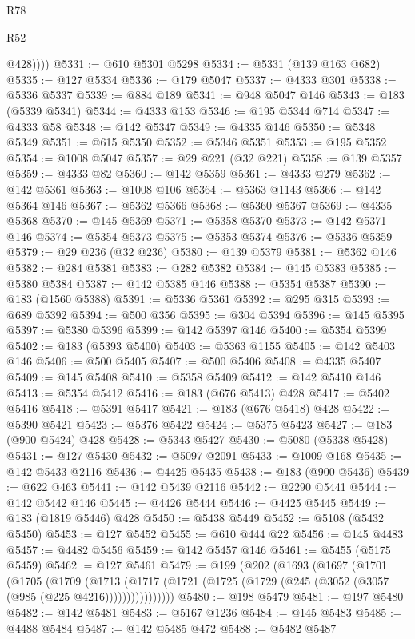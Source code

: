 \begin{lexlean}{R78}
\begin{lexlean}{R52}
\begin{coremodule}
{{{{{{{{{{{{{{{{{{{{{{{{{{{{{{{{{{{{{{{{{{{{{{{{{{{{{{{{{{{{{{{{{{{{{{{{{{{{{{{{{{{{{{{{{{{{{{{{{{{{{{{{{{{{{{{{{{{{{{{{{{{{{{{{{{{{{{{{{{{{{{{{{{{{{{{{{{{{{{{{{{{{{{{{{{{{{{{{{{{{{{{{{{{{{{{{{{{{{{            @428))))
@5331 := @610 @5301 @5298
@5334 := @5331 (@139 @163 @682)
@5335 := @127 @5334
@5336 := @179 @5047
@5337 := @4333 @301
@5338 := @5336 @5337
@5339 := @884 @189
@5341 := @948 @5047 @146
@5343 := @183 (@5339 @5341)
@5344 := @4333 @153
@5346 := @195 @5344 @714
@5347 := @4333 @58
@5348 := @142 @5347
@5349 := @4335 @146
@5350 := @5348 @5349
@5351 := @615 @5350
@5352 := @5346 @5351
@5353 := @195 @5352
@5354 := @1008 @5047
@5357 := @29 @221 (@32 @221)
@5358 := @139 @5357
@5359 := @4333 @82
@5360 := @142 @5359
@5361 := @4333 @279
@5362 := @142 @5361
@5363 := @1008 @106
@5364 := @5363 @1143
@5366 := @142 @5364 @146
@5367 := @5362 @5366
@5368 := @5360 @5367
@5369 := @4335 @5368
@5370 := @145 @5369
@5371 := @5358 @5370
@5373 := @142 @5371 @146
@5374 := @5354 @5373
@5375 := @5353 @5374
@5376 := @5336 @5359
@5379 := @29 @236 (@32 @236)
@5380 := @139 @5379
@5381 := @5362 @146
@5382 := @284 @5381
@5383 := @282 @5382
@5384 := @145 @5383
@5385 := @5380 @5384
@5387 := @142 @5385 @146
@5388 := @5354 @5387
@5390 := @183 (@1560 @5388)
@5391 := @5336 @5361
@5392 := @295 @315
@5393 := @689 @5392
@5394 := @500 @356
@5395 := @304 @5394
@5396 := @145 @5395
@5397 := @5380 @5396
@5399 := @142 @5397 @146
@5400 := @5354 @5399
@5402 := @183 (@5393 @5400)
@5403 := @5363 @1155
@5405 := @142 @5403 @146
@5406 := @500 @5405
@5407 := @500 @5406
@5408 := @4335 @5407
@5409 := @145 @5408
@5410 := @5358 @5409
@5412 := @142 @5410 @146
@5413 := @5354 @5412
@5416 := @183 (@676 @5413) @428
@5417 := @5402 @5416
@5418 := @5391 @5417
@5421 := @183 (@676 @5418) @428
@5422 := @5390 @5421
@5423 := @5376 @5422
@5424 := @5375 @5423
@5427 := @183 (@900 @5424) @428
@5428 := @5343 @5427
@5430 := @5080 (@5338 @5428)
@5431 := @127 @5430
@5432 := @5097 @2091
@5433 := @1009 @168
@5435 := @142 @5433 @2116
@5436 := @4425 @5435
@5438 := @183 (@900 @5436)
@5439 := @622 @463
@5441 := @142 @5439 @2116
@5442 := @2290 @5441
@5444 := @142 @5442 @146
@5445 := @4426 @5444
@5446 := @4425 @5445
@5449 := @183 (@1819 @5446) @428
@5450 := @5438 @5449
@5452 := @5108 (@5432 @5450)
@5453 := @127 @5452
@5455 := @610 @444 @22
@5456 := @145 @4483
@5457 := @4482 @5456
@5459 := @142 @5457 @146
@5461 := @5455 (@5175 @5459)
@5462 := @127 @5461
@5479 := @199
    (@202
      (@1693
        (@1697
          (@1701
            (@1705
              (@1709
                (@1713
                  (@1717 (@1721 (@1725 (@1729 (@245 (@3052 (@3057 (@985 (@225 @4216))))))))))))))))
@5480 := @198 @5479
@5481 := @197 @5480
@5482 := @142 @5481
@5483 := @5167 @1236
@5484 := @145 @5483
@5485 := @4488 @5484
@5487 := @142 @5485 @472
@5488 := @5482 @5487
}}}}}}}}}}}}}}}}}}}}}}}}}}}}}}}}}}}}}}}}}}}}}}}}}}}}}}}}}}}}}}}}}}}}}}}}}}}}}}}}}}}}}}}}}}}}}}}}}}}}}}}}}}}}}}}}}}}}}}}}}}}}}}}}}}}}}}}}}}}}}}}}}}}}}}}}}}}}}}}}}}}}}}}}}}}}}}}}}}}}}}}}}}}}}}}}}}}}}}
\end{coremodule}
\end{lexlean}
\end{lexlean}
